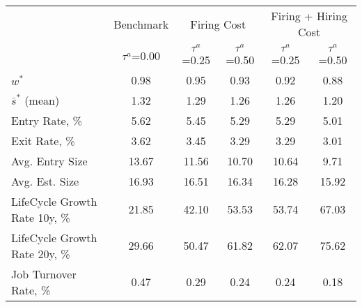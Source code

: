 \begin{tabular}{lccccc}
\toprule
{} &     Benchmark & \multicolumn{2}{c}{Firing Cost} & \multicolumn{2}{c}{Firing + Hiring Cost} \\
{} & $\tau^a$=0.00 & $\tau^a$=0.25 & $\tau^a$=0.50 &        $\tau^a$=0.25 & $\tau^a$=0.50 \\
\midrule
$w^*$                         &          0.98 &          0.95 &          0.93 &                 0.92 &          0.88 \\
$\bar{s}^*$ (mean)            &          1.32 &          1.29 &          1.26 &                 1.26 &          1.20 \\
Entry Rate, \%                &          5.62 &          5.45 &          5.29 &                 5.29 &          5.01 \\
Exit Rate, \%                 &          3.62 &          3.45 &          3.29 &                 3.29 &          3.01 \\
Avg. Entry Size               &         13.67 &         11.56 &         10.70 &                10.64 &          9.71 \\
Avg. Est. Size                &         16.93 &         16.51 &         16.34 &                16.28 &         15.92 \\
LifeCycle Growth Rate 10y, \% &         21.85 &         42.10 &         53.53 &                53.74 &         67.03 \\
LifeCycle Growth Rate 20y, \% &         29.66 &         50.47 &         61.82 &                62.07 &         75.62 \\
Job Turnover Rate, \%         &          0.47 &          0.29 &          0.24 &                 0.24 &          0.18 \\
\bottomrule
\end{tabular}
